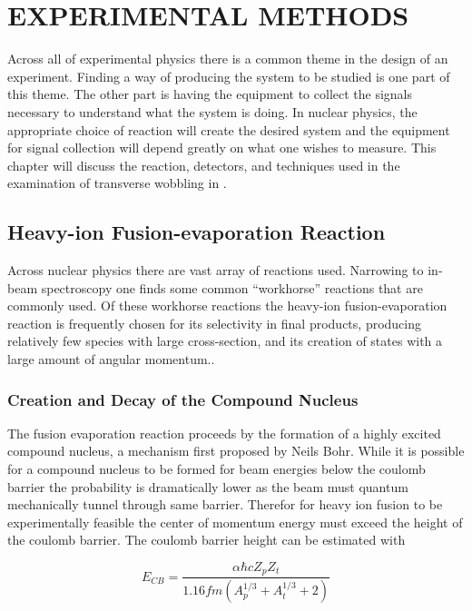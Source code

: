 %
%

\chapter{EXPERIMENTAL METHODS}
\label{chp:exp-pr}
Across all of experimental physics there is a common theme in the design of an experiment. Finding a way of producing the system to be studied is one part of this theme. The other part is having the equipment to collect the signals necessary to understand what the system is doing. In nuclear physics, the appropriate choice of reaction will create the desired system and the equipment for signal collection will depend greatly on what one wishes to measure. This chapter will discuss the reaction, detectors, and techniques used in the examination of transverse wobbling in \pr{}.
\section{Heavy-ion Fusion-evaporation Reaction}
\label{sec:exp-pr-fus-evap}
Across nuclear physics there are vast array of reactions used. Narrowing to in-beam \gr{} spectroscopy one finds some common ``workhorse'' reactions that are commonly used. Of these workhorse reactions the heavy-ion fusion-evaporation reaction is frequently chosen for its selectivity in final products, producing relatively few species with large cross-section, and its creation of states with a large amount of angular momentum.\cite{beausang1996arrays}.
\subsection{Creation and Decay of the Compound Nucleus}
\label{ssec:exp-pr-fus-evap-cn}
The fusion evaporation reaction proceeds by the formation of a highly excited compound nucleus, a mechanism first proposed by Neils Bohr\cite{bohr1936neutron}. While it is possible for a compound nucleus to be formed for beam energies below the coulomb barrier the probability is dramatically lower as the beam must quantum mechanically tunnel through same barrier. Therefor for heavy ion fusion to be experimentally feasible the center of momentum energy must exceed the height of the coulomb barrier. The coulomb barrier height can be estimated with

\begin{equation}
\label{eqn:cb_en}
E_{CB}=\frac{\alpha \hbar c Z_p Z_t}{1.16 fm (A_p^{1/3} + A_t^{1/3} + 2)}
\end{equation}

